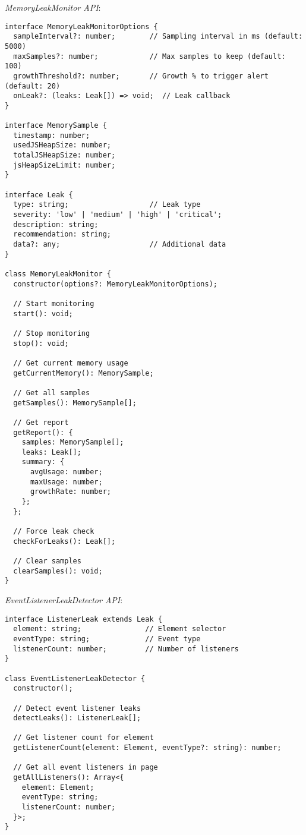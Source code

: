 \documentclass[11pt]{article}
\begin{document}
\emph{MemoryLeakMonitor API}:

\begin{verbatim}
interface MemoryLeakMonitorOptions {
  sampleInterval?: number;        // Sampling interval in ms (default: 5000)
  maxSamples?: number;            // Max samples to keep (default: 100)
  growthThreshold?: number;       // Growth % to trigger alert (default: 20)
  onLeak?: (leaks: Leak[]) => void;  // Leak callback
}

interface MemorySample {
  timestamp: number;
  usedJSHeapSize: number;
  totalJSHeapSize: number;
  jsHeapSizeLimit: number;
}

interface Leak {
  type: string;                   // Leak type
  severity: 'low' | 'medium' | 'high' | 'critical';
  description: string;
  recommendation: string;
  data?: any;                     // Additional data
}

class MemoryLeakMonitor {
  constructor(options?: MemoryLeakMonitorOptions);
  
  // Start monitoring
  start(): void;
  
  // Stop monitoring
  stop(): void;
  
  // Get current memory usage
  getCurrentMemory(): MemorySample;
  
  // Get all samples
  getSamples(): MemorySample[];
  
  // Get report
  getReport(): {
    samples: MemorySample[];
    leaks: Leak[];
    summary: {
      avgUsage: number;
      maxUsage: number;
      growthRate: number;
    };
  };
  
  // Force leak check
  checkForLeaks(): Leak[];
  
  // Clear samples
  clearSamples(): void;
}
\end{verbatim}

\emph{EventListenerLeakDetector API}:

\begin{verbatim}
interface ListenerLeak extends Leak {
  element: string;               // Element selector
  eventType: string;             // Event type
  listenerCount: number;         // Number of listeners
}

class EventListenerLeakDetector {
  constructor();
  
  // Detect event listener leaks
  detectLeaks(): ListenerLeak[];
  
  // Get listener count for element
  getListenerCount(element: Element, eventType?: string): number;
  
  // Get all event listeners in page
  getAllListeners(): Array<{
    element: Element;
    eventType: string;
    listenerCount: number;
  }>;
}
\end{verbatim}
\end{document}
